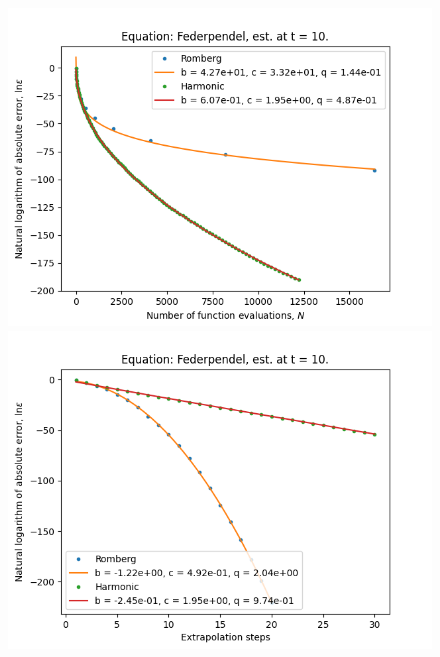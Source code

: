\begin{figure}[H]
\centering
\begin{minipage}{0.45\textwidth}
\centering
\includegraphics[scale=0.45]{../results/emr_plots/federpendel_10_hp_trend.png}
\end{minipage}
\begin{minipage}{0.45\textwidth}
\centering
\includegraphics[scale=0.45]{../results/emr_plots/federpendel_10_hp_steps.png}
\end{minipage}
\end{figure}

